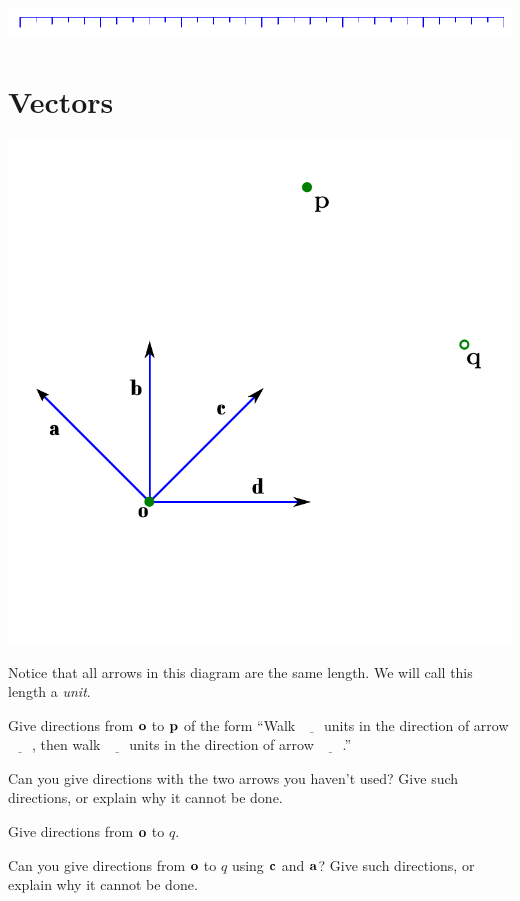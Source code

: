 \documentclass{article}
\newcommand{\ul}{$\underline{\phantom{xxx}}$}
\begin{document}
	\includegraphics{ruler.pdf}
\section*{Vectors}

	\includegraphics{vectors-graphically.pdf}

	Notice that all arrows in this diagram are the same length.
	We will call this length a \emph{unit}.
	\begin{Enum}
		\item Give directions from $\bf o$ to $\bf p$ of
		the form ``Walk \ul units in the direction of arrow \ul, then 
		walk \ul units in the direction of arrow \ul.''

		\item Can you give directions with the two arrows you haven't
		used?  Give such directions, or explain why it cannot be done.

		\item Give directions from $\bf o$ to $q$.

		\item Can you give directions from $\bf o$ to $q$ using $\bf c$ and $\bf a$?
		Give such directions, or explain why it cannot be done.

	\end{Enum}
\end{document}
